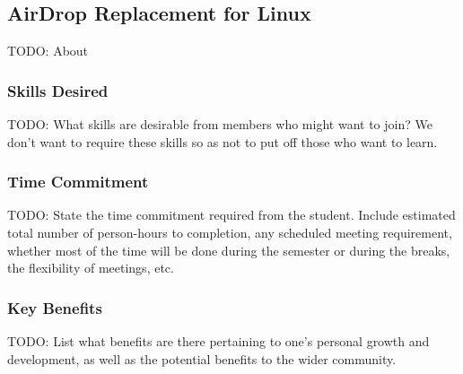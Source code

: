 \documentclass[../proposal-for-projects-2025.tex]{subfiles}
\begin{document}
\subsection{AirDrop Replacement for Linux}

TODO: About

\subsubsection*{Skills Desired}

TODO: What skills are desirable from members who might want to join?  We don't want to require these skills so as not to put off those who want to learn.

\subsubsection*{Time Commitment}

TODO: State the time commitment required from the student.  Include estimated total number of person-hours to completion, any scheduled meeting requirement, whether most of the time will be done during the semester or during the breaks, the flexibility of meetings, etc.

\subsubsection*{Key Benefits}

TODO: List what benefits are there pertaining to one's personal growth and development, as well as the potential benefits to the wider community.
\end{document}

